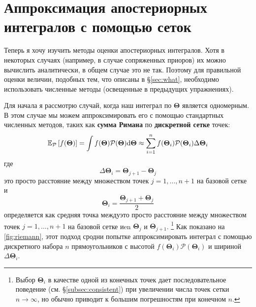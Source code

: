 \documentclass[12pt, titlepage]{article}
\newcommand{\deriv}{\ensuremath{{\rm d}}}  %
\newcommand{\meanwrt}[2]{\ensuremath{\mathbb{E}_{{#2}}\left[{#1}\right]}}
\newcommand{\params}{\ensuremath{\boldsymbol\Theta}}
\newcommand{\posterior}{\ensuremath{\mathcal{P}}}
\begin{document}
\section{Аппроксимация апостериорных интегралов с помощью сеток} \label{sec:grid}

Теперь я хочу изучить методы оценки апостериорных интегралов. Хотя в некоторых случаях (например, в случае сопряженных приоров) их можно вычислить аналитически, в общем случае это не так. Поэтому для правильной оценки величин, подобных тем, что описаны в \S\ref{sec:what}, необходимо использовать численные методы (освещенные в предыдущих упражнениях).

Для начала я рассмотрю случай, когда наш интеграл по $\params$ является одномерным. В этом случае мы можем аппроксимировать его с помощью стандартных численных методов, таких как \textbf{сумма Римана} по \textbf{дискретной сетке} точек:
\begin{equation}
    \meanwrt{f(\params)}{\posterior} 
    = \int f(\params) \posterior(\params) \deriv \params
    \approx \sum_{i=1}^{n} f(\params_i) 
    \posterior(\params_i) \Delta \params_i
\end{equation}
где
\begin{equation}
    \Delta \params_i = \params_{j+1} - \params_{j}
\end{equation}
это просто расстояние между множеством точек $j=1,\dots,n+1$ на базовой сетке и
\begin{equation}
    \params_i = \frac{\params_{j+1} + \params_{j}}{2}
\end{equation}
определяется как средняя точка междуэто просто расстояние между множеством точек $j=1,\dots,n+1$ на базовой сетке иen $\params_j$ и $\params_{j+1}$. \footnote{Выбор $\params_i$ в качестве одной из конечных точек дает последовательное поведение (см. \S\ref{subsec:consistent}) при увеличении числа точек сетки $n \rightarrow \infty$, но обычно приводит к большим погрешностям при конечном $n$.} Как показано на {\color{red} \autoref{fig:riemann}}, этот подход сродни попытке аппроксимировать интеграл с помощью дискретного набора $n$ прямоугольников с высотой $f(\params_i) \posterior(\params_i)$ и шириной $\Delta \params_i$.
\end{document}
